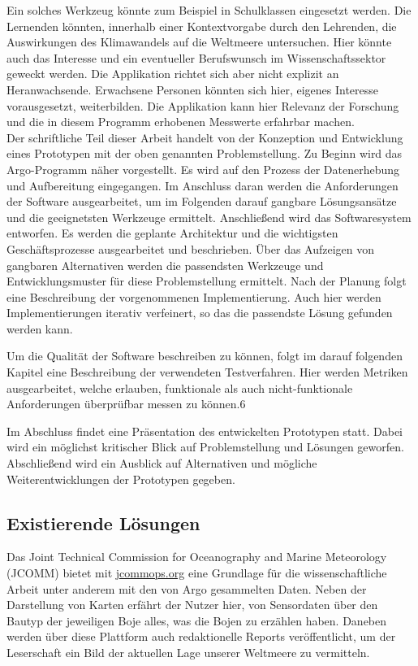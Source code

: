 Ein solches Werkzeug könnte zum Beispiel in Schulklassen eingesetzt werden. 
Die Lernenden könnten, innerhalb einer Kontextvorgabe durch den Lehrenden, die Auswirkungen des Klimawandels auf die Weltmeere untersuchen.
Hier könnte auch das Interesse und ein eventueller Berufswunsch im Wissenschaftssektor geweckt werden.
Die Applikation richtet sich aber nicht explizit an Heranwachsende. Erwachsene Personen könnten sich hier, eigenes Interesse vorausgesetzt, weiterbilden. Die Applikation kann hier Relevanz der Forschung und die in diesem Programm erhobenen Messwerte erfahrbar machen. \\


Der schriftliche Teil dieser Arbeit handelt von der Konzeption und Entwicklung eines Prototypen mit der oben genannten Problemstellung. Zu Beginn wird das Argo-Programm näher vorgestellt. Es wird auf den Prozess der Datenerhebung und Aufbereitung eingegangen. Im Anschluss daran werden die Anforderungen der Software ausgearbeitet, um im Folgenden darauf gangbare Lösungsansätze und die geeignetsten Werkzeuge ermittelt.
Anschließend wird das Softwaresystem entworfen. Es werden die geplante Architektur und die wichtigsten Geschäftsprozesse ausgearbeitet und beschrieben. Über das 
Aufzeigen von gangbaren Alternativen werden die passendsten Werkzeuge und Entwicklungsmuster für diese Problemstellung ermittelt.
Nach der Planung folgt eine Beschreibung der vorgenommenen Implementierung. Auch hier werden Implementierungen iterativ verfeinert, so das die passendste Lösung gefunden werden kann.

Um die Qualität der Software beschreiben zu können, folgt im darauf folgenden Kapitel eine Beschreibung der verwendeten Testverfahren. Hier werden Metriken ausgearbeitet, welche erlauben, funktionale als auch nicht-funktionale Anforderungen überprüfbar messen zu können.6 

Im Abschluss findet eine Präsentation des entwickelten Prototypen statt. Dabei wird ein möglichst kritischer Blick auf Problemstellung und Lösungen geworfen. Abschließend wird ein Ausblick auf Alternativen und mögliche Weiterentwicklungen der Prototypen gegeben.



\subsection{Existierende Lösungen}


Das Joint Technical Commission for Oceanography and Marine Meteorology (JCOMM) bietet mit 
\url{jcommops.org} eine Grundlage für die wissenschaftliche Arbeit unter anderem mit den von Argo gesammelten Daten. Neben der Darstellung von Karten erfährt der Nutzer hier, von Sensordaten über den Bautyp der jeweiligen Boje alles, was die Bojen zu erzählen haben. Daneben werden über diese Plattform auch redaktionelle Reports veröffentlicht, um der Leserschaft ein Bild der aktuellen Lage unserer Weltmeere zu vermitteln. 

